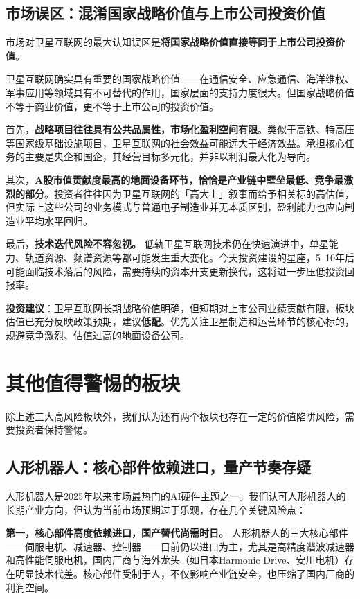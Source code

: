 \subsection{市场误区：混淆国家战略价值与上市公司投资价值}

市场对卫星互联网的最大认知误区是\textbf{将国家战略价值直接等同于上市公司投资价值}。

卫星互联网确实具有重要的国家战略价值——在通信安全、应急通信、海洋维权、军事应用等领域具有不可替代的作用，国家层面的支持力度很大。但国家战略价值不等于商业价值，更不等于上市公司的投资价值。

首先，\textbf{战略项目往往具有公共品属性，市场化盈利空间有限}。类似于高铁、特高压等国家级基础设施项目，卫星互联网的社会效益可能远大于经济效益。承担核心任务的主要是央企和国企，其经营目标多元化，并非以利润最大化为导向。

其次，\textbf{A股市值贡献度最高的地面设备环节，恰恰是产业链中壁垒最低、竞争最激烈的部分}。投资者往往因为卫星互联网的「高大上」叙事而给予相关标的高估值，但实际上这些公司的业务模式与普通电子制造业并无本质区别，盈利能力也应向制造业平均水平回归。

最后，\textbf{技术迭代风险不容忽视。} 低轨卫星互联网技术仍在快速演进中，单星能力、轨道资源、频谱资源等都可能发生重大变化。今天投资建设的星座，5--10年后可能面临技术落后的风险，需要持续的资本开支更新换代，这将进一步压低投资回报率。

\textbf{投资建议}：卫星互联网长期战略价值明确，但短期对上市公司业绩贡献有限，板块估值已充分反映政策预期，建议\textbf{低配}。优先关注卫星制造和运营环节的核心标的，规避竞争激烈、估值过高的地面设备公司。

\section{其他值得警惕的板块}

除上述三大高风险板块外，我们认为还有两个板块也存在一定的价值陷阱风险，需要投资者保持警惕。

\subsection{人形机器人：核心部件依赖进口，量产节奏存疑}

人形机器人是2025年以来市场最热门的AI硬件主题之一。我们认可人形机器人的长期产业方向，但认为当前市场预期过于乐观，存在几个关键风险点：

\textbf{第一，核心部件高度依赖进口，国产替代尚需时日。} 人形机器人的三大核心部件——伺服电机、减速器、控制器——目前仍以进口为主，尤其是高精度谐波减速器和高性能伺服电机，国内厂商与海外龙头（如日本Harmonic Drive、安川电机）存在明显技术代差。核心部件受制于人，不仅影响产业链安全，也压缩了国内厂商的利润空间。

